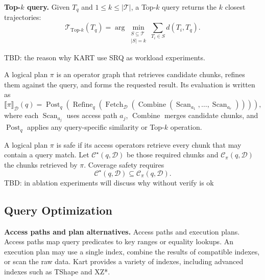 \noindent\textbf{Top-$k$ query.}
Given $T_q$ and $1\le k\le|\mathcal{T}|$, a Top-$k$ query returns the $k$ closest trajectories:
\begin{equation}\label{eq:topk}
\mathcal{T}_{\mathrm{Top}\text{-}k}(T_q)
=\arg\min_{\substack{S\subseteq\mathcal{T}\\|S|=k}}
\sum_{T_i\in S}d(T_i,T_q).
\end{equation}

TBD: the reason why KART use SRQ as workload experiments.

\begin{kartdefinition}
A logical plan $\pi$ is an operator graph that retrieves candidate chunks, refines them against the query, and forms the requested result.
  Its evaluation is written as
\begin{equation}\label{eq:logical-plan}
\llbracket\pi\rrbracket_{\mathcal{D}}(q)
=\operatorname{Post}_{q}\!\left(\operatorname{Refine}_{q}\!\left(\operatorname{Fetch}_{\mathcal{D}}\!\left(\operatorname{Combine}\!\left(\operatorname{Scan}_{a_1},\ldots,\operatorname{Scan}_{a_r}\right)\right)\right)\right),
\end{equation}
where each $\operatorname{Scan}_{a_j}$ uses access path $a_j$, $\operatorname{Combine}$ merges candidate chunks, and $\operatorname{Post}_{q}$ applies any query-specific similarity or Top-$k$ operation.
\end{kartdefinition}

\begin{kartdefinition}
A logical plan $\pi$ is safe if its access operators retrieve every chunk that may contain a query match.
  Let $\mathcal{C}^{\star}(q,\mathcal{D})$ be those required chunks and $\mathcal{C}_{\pi}(q,\mathcal{D})$ the chunks retrieved by $\pi$. Coverage safety requires
\begin{equation}\label{eq:coverage}
\mathcal{C}^{\star}(q,\mathcal{D})
\subseteq\mathcal{C}_{\pi}(q,\mathcal{D}).
\end{equation}
TBD: in ablation experiments will discuss why without verify is ok
\end{kartdefinition}

\subsection{Query Optimization}\label{sec:optimization}

\noindent\textbf{Access paths and plan alternatives.}
Access paths and execution plans. Access paths map query predicates to key ranges
or equality lookups. An execution plan may use a single index, combine the results of compatible indexes, or
scan the raw data. Kart provides a variety of indexes, including advanced indexes such as TShape and XZ*.

